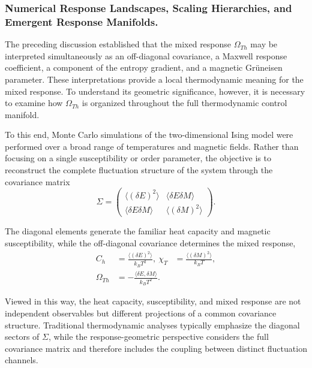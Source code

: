 \subsubsection{Numerical Response Landscapes, Scaling Hierarchies, and Emergent Response Manifolds.}

The preceding discussion established that the mixed response
\(\Omega_{Th}\) may be interpreted simultaneously as an
off-diagonal covariance, a Maxwell response coefficient, a
component of the entropy gradient, and a magnetic
Gr\"uneisen parameter. These interpretations provide a local
thermodynamic meaning for the mixed response. To understand its
geometric significance, however, it is necessary to examine how
\(\Omega_{Th}\) is organized throughout the full thermodynamic
control manifold.

To this end, Monte Carlo simulations of the two-dimensional
Ising model were performed over a broad range of temperatures
and magnetic fields. Rather than focusing on a single
susceptibility or order parameter, the objective is to
reconstruct the complete fluctuation structure of the system
through the covariance matrix
\begin{equation}
\Sigma
=
\begin{pmatrix}
\langle (\delta E)^2 \rangle &
\langle \delta E\delta M \rangle \\
\langle \delta E\delta M \rangle &
\langle (\delta M)^2 \rangle
\end{pmatrix}.
\end{equation}

The diagonal elements generate the familiar heat capacity and
magnetic susceptibility, while the off-diagonal covariance
determines the mixed response,
\begin{align}
C_h
&=
\frac{\langle (\delta E)^2 \rangle}
{k_B T^2},
\
\chi_T
&=
\frac{\langle (\delta M)^2 \rangle}
{k_B T},
\\
\Omega_{Th}
&=
-\frac{\langle \delta E,\delta M \rangle}
{k_B T^2}.
\end{align}

Viewed in this way, the heat capacity, susceptibility, and
mixed response are not independent observables but different
projections of a common covariance structure. Traditional
thermodynamic analyses typically emphasize the diagonal sectors
of \(\Sigma\), while the response-geometric perspective
considers the full covariance matrix and therefore includes the
coupling between distinct fluctuation channels.



